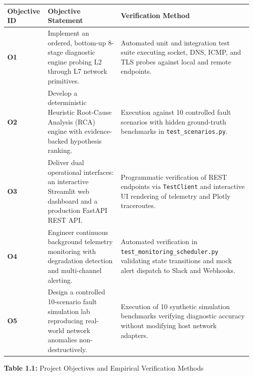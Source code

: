 \documentclass[
]{article}
\newcounter{none} %
\begin{document}
{\def\LTcaptype{none} %
\begin{longtable}[]{@{}
  >{\raggedright\arraybackslash}p{}
  >{\raggedright\arraybackslash}p{}
  >{\raggedright\arraybackslash}p{}@{}}
\toprule\noalign{}
\begin{minipage}[b]{\linewidth}\raggedright
\textbf{Objective ID}
\end{minipage} & \begin{minipage}[b]{\linewidth}\raggedright
\textbf{Objective Statement}
\end{minipage} & \begin{minipage}[b]{\linewidth}\raggedright
\textbf{Verification Method}
\end{minipage} \\
\midrule\noalign{}
\endhead
\bottomrule\noalign{}
\endlastfoot
\textbf{O1} & Implement an ordered, bottom-up 8-stage diagnostic engine probing L2 through L7 network primitives. & Automated unit and integration test suite executing socket, DNS, ICMP, and TLS probes against local and remote endpoints. \\
\textbf{O2} & Develop a deterministic Heuristic Root-Cause Analysis (RCA) engine with evidence-backed hypothesis ranking. & Execution against 10 controlled fault scenarios with hidden ground-truth benchmarks in \texttt{test\_scenarios.py}. \\
\textbf{O3} & Deliver dual operational interfaces: an interactive Streamlit web dashboard and a production FastAPI REST API. & Programmatic verification of REST endpoints via \texttt{TestClient} and interactive UI rendering of telemetry and Plotly traceroutes. \\
\textbf{O4} & Engineer continuous background telemetry monitoring with degradation detection and multi-channel alerting. & Automated verification in \texttt{test\_monitoring\_scheduler.py} validating state transitions and mock alert dispatch to Slack and Webhooks. \\
\textbf{O5} & Design a controlled 10-scenario fault simulation lab reproducing real-world network anomalies non-destructively. & Execution of 10 synthetic simulation benchmarks verifying diagnostic accuracy without modifying host network adapters. \\
\end{longtable}
}

\begin{center}
\textbf{Table 1.1:} Project Objectives and Empirical Verification Methods
\end{center}
\end{document}
